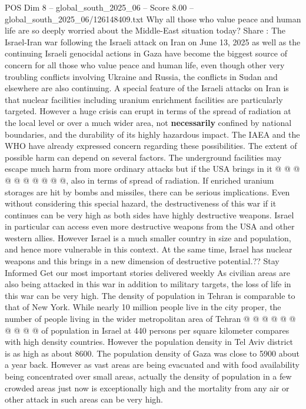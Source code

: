 \begin{textsample}{POS Dim 8 – global\_south\_2025\_06 – Score 8.00 – global\_south\_2025\_06/126148409.txt}  \label{ex:f8_pos_191}
Why all those who value peace and human life are so deeply worried about the Middle-East situation today?
Share : The Israel-Iran war following the Israeli attack on Iran on June 13, 2025 as well as the continuing Israeli genocidal actions in Gaza have become the biggest source of concern for all those who value peace and human life, even though other very troubling conflicts involving Ukraine and Russia, the conflicts in Sudan and elsewhere are also continuing.
A special feature of the Israeli attacks on Iran is that nuclear facilities including uranium enrichment facilities are particularly targeted.
However a huge crisis can erupt in terms of the spread of radiation at the local level or over a much wider area, not \textbf{necessarily} confined by national boundaries, and the durability of its highly hazardous impact.
The IAEA and the WHO have already expressed concern regarding these possibilities.
The extent of possible harm can depend on several factors.
The underground facilities may escape much harm from more ordinary attacks but if the USA brings in it @ @ @ @ @ @ @ @ @ @, also in terms of spread of radiation.
If enriched uranium storages are hit by bombs and missiles, there can be serious implications.
Even without considering this special hazard, the destructiveness of this war if it continues can be very high as both sides have highly destructive weapons.
Israel in particular can access even more destructive weapons from the USA and other western allies.
However Israel is a much smaller country in size and population, and hence more vulnerable in this context.
At the same time, Israel has nuclear weapons and this brings in a new dimension of destructive potential.??
Stay Informed Get our most important stories delivered weekly As civilian areas are also being attacked in this war in addition to military targets, the loss of life in this war can be very high.
The density of population in Tehran is comparable to that of New York.
While nearly 10 million people live in the city proper, the number of people living in the wider metropolitan area of Tehran @ @ @ @ @ @ @ @ @ @ of population in Israel at 440 persons per square kilometer compares with high density countries.
However the population density in Tel Aviv district is as high as about 8600.
The population density of Gaza was close to 5900 about a year back.
However as vast areas are being evacuated and with food availability being concentrated over small areas, actually the density of population in a few crowded areas just now is exceptionally high and the mortality from any air or other attack in such areas can be very high.

\end{textsample}
